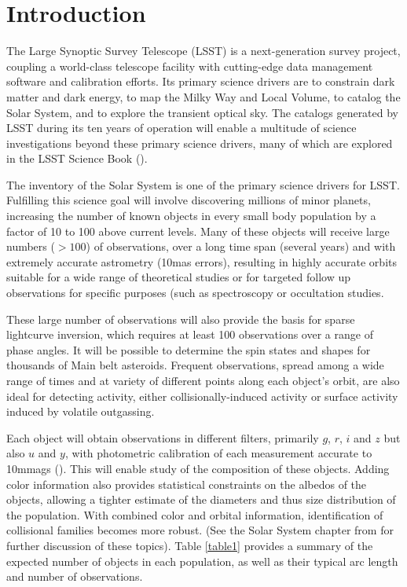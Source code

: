 \documentclass{iau}
\begin{document}
\section{Introduction}

The Large Synoptic Survey Telescope (LSST) is a next-generation survey
project, coupling a world-class telescope facility with cutting-edge
data management software and calibration efforts. Its primary science
drivers are to constrain dark matter and dark energy, to map the Milky
Way and Local Volume, to catalog the Solar System, and to explore
the transient optical sky. The catalogs generated by LSST during its
ten years of operation will enable a multitude of science
investigations beyond these primary science drivers, many of which are
explored in the LSST Science Book (\cite{scibook}). 

The inventory of the Solar System is one of the primary science
drivers for LSST. Fulfilling this science goal will involve
discovering millions of minor planets, increasing the number of known
objects in every small body population by a factor of 10 to 100 above
current levels. Many of these objects will receive large numbers
($>100$) of observations, over a long time span (several years) and with
extremely accurate astrometry (10mas errors), resulting in highly
accurate orbits suitable for a wide range of theoretical studies or
for targeted follow up observations for specific purposes (such as
spectroscopy or occultation studies.

These large number of observations will also provide the basis for
sparse lightcurve inversion, which requires at least 100 observations
over a range of phase angles. It will be possible to determine
the spin states and shapes for thousands of Main belt
asteroids. Frequent observations, spread among a wide range of times
and at variety of different points along each object's orbit, are also
ideal for detecting activity, either collisionally-induced activity or
surface activity induced by volatile outgassing.

Each object will obtain observations in different filters, primarily $g$,
$r$, $i$ and $z$ but also $u$ and $y$, with photometric calibration of
each measurement accurate to 10mmags (\cite{lsstoverview}). This will enable study of the
composition of these objects. Adding color information also
provides statistical constraints on the albedos of the objects,
allowing a tighter estimate of the diameters and thus size
distribution of the population. With combined color and orbital
information, identification of collisional families becomes more
robust. (See the Solar System chapter from \cite{scibook} for further discussion of these
topics). Table \ref{table1} provides a summary of the expected number
of objects in each population, as well as their typical arc length and
number of observations.
\end{document}
